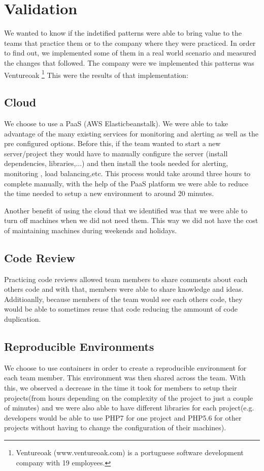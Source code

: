 \documentclass{llncs}
\begin{document}
\section{Validation}
We wanted to know if the indetified patterns were able to bring value to the teams that practice them or to the company where they were practiced. In order to find out, we implemented some of them in a real world scenario and measured the changes that followed.
The company were we implemented this patterns was Ventureoak \footnote{Ventureoak (www.ventureoak.com) is a portuguese software development company with 19 employees.} This were the results of that implementation:

  \subsection{Cloud}
  We choose to use a PaaS (AWS Elasticbeanstalk). We were able to take advantage of the many existing services for monitoring and alerting as well as the pre configured options. Before this, if the team wanted to start a new server/project they would have to manually configure the server (install dependencies, libraries,...) and then install the tools needed for alerting, monitoring , load balancing,etc. This process would take around three hours to complete manually, with the help of the PaaS platform we were able to reduce the time needed to setup a new environment to around 20 minutes.

  Another benefit of using the cloud that we identified was that we were able to turn off machines when we did not need them. This way we did not have the cost of maintaining machines during weekends and holidays.

  \subsection{Code Review}
  Practicing code reviews allowed team members to share comments about each others code and with that, members were able to share knowledge and ideas. Additioanlly, because members of the team would see each others code, they would be able to sometimes reuse that code reducing the ammount of code duplication.

  \subsection{Reproducible Environments}
  We choose to use containers in order to create a reproducible environment for each team member. This environment was then shared across the team. With this, we observed a decrease in the time it took for members to setup their projects(from hours depending on the complexity of the project to just a couple of minutes) and we were also able to have different libraries for each project(e.g. developers would be able to use PHP7 for one project and PHP5.6 for other projects without having to change the configuration of their machines).
\end{document}
